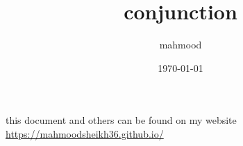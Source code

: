 \documentclass[a4paper,12pt]{article}
\author{mahmood}
\date{\today}
\title{conjunction}
\begin{document}
\maketitle
\begin{note}
this document and others can be found on my website\\
\url{https://mahmoodsheikh36.github.io/}
\end{note}
\end{document}
